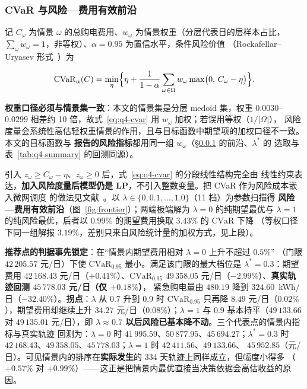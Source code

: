 \subsubsection{CVaR 与风险—费用有效前沿}\label{sec:q4-frontier}

记 \(C_\omega\) 为情景 \(\omega\) 的总购电费用、\(w_\omega\) 为情景权重（分层代表日的层样本占比，
\(\sum_\omega w_\omega=1\)，非等权）、\(\alpha=0.95\) 为置信水平，条件风险价值
（Rockafellar--Uryasev 形式~\cite{refrockafellar}）为

\begin{equation}
  \mathrm{CVaR}_\alpha(C)=\min_{\eta}\Bigl\{\eta+\frac{1}{1-\alpha}
  \sum_{\omega\in\Omega}w_\omega\max\bigl(0,\,C_\omega-\eta\bigr)\Bigr\}.
  \label{eq:q4-cvar}
\end{equation}

\textbf{权重口径必须与情景集一致}：本文的情景集是分层 medoid 集，权重 \(0.0030\)--\(0.0299\)
相差约 10 倍，故式~\eqref{eq:q4-cvar} 用 \(w_\omega\) 加权；若误用等权（\(1/|\Omega|\)），
风险度量会系统性高估轻权重情景的作用，且与目标函数中期望项的加权口径不一致。本文的目标函数与
\textbf{报告的风险指标}都用同一组 \(w_\omega\)（\S\ref{sec:q4-frontier} 的前沿、\(\lambda^*\) 的
选取与表~\ref{tab:q4-summary} 的回测同源）。

引入 \(z_\omega\ge C_\omega-\eta\)、\(z_\omega\ge0\) 后，式~\eqref{eq:q4-cvar} 的分段线性结构完全由
线性约束表达，\textbf{加入风险度量后模型仍是 LP}，不引入整数变量。把 CVaR 作为风险成本嵌入微网调度
的做法见文献~\cite{refchenhan}。以 \(\lambda\in\{0,0.1,\dots,1.0\}\)（11 档）为参数扫描得
\textbf{风险—费用有效前沿}（图~\ref{fig:frontier}）；两端极端解为 \(\lambda=0\) 的纯期望最优与
\(\lambda=1\) 的纯风险最优，后者以 \(0.99\%\) 的期望费用换取 \(3.43\%\) 的 \(\mathrm{CVaR}\) 下降
（等权口径下同一组解报 \(3.19\%\)，差别只来自风险统计量的加权方式，见上段）。

\textbf{推荐点的判据事先锁定}：在“情景内期望费用相对 \(\lambda=0\) 上升不超过 \(0.5\%\)”
（门限 \(42\,205.57\) 元/日）下使 \(\mathrm{CVaR}_{0.95}\) 最小。满足该门限的最大档位是
\(\lambda^{*}=0.3\)：期望费用 \(42\,168.43\) 元/日（\(+0.41\%\)）、\(\mathrm{CVaR}_{0.95}\)
\(49\,358.05\) 元/日（\(-2.99\%\)）、\textbf{真实轨迹回测 \(45\,778.03\) 元/日（仅 \(+0.18\%\)）}，
紧急购电量由 \(480.19\) 降到 \(324.60\)~kWh/日（\(-32.40\%\)）。\textbf{拐点}：\(\lambda\) 从 0.7 升到
0.9 时 \(\mathrm{CVaR}_{0.95}\) 只再降 \(8.49\) 元/日（\(0.02\%\)），期望费用却继续上升
\(34.27\) 元/日（\(0.08\%\)）；\(\lambda=1\) 与 0.9 基本持平（\(49\,133.66\) 对 \(49\,135.01\)
元/日），即 \textbf{\(\lambda\approx0.7\) 以后风险已基本降不动}。三个代表点的情景内指标与真实轨迹
回测为：\(\lambda=0\) 时 \(41\,995.59\)、\(50\,877.95\)、\(45\,694.27\)；\(\lambda^{*}=0.3\) 时
\(42\,168.43\)、\(49\,358.05\)、\(45\,778.03\)；\(\lambda=1\) 时 \(42\,411.56\)、\(49\,133.66\)、
\(45\,952.85\)（元/日）。可见情景内的排序在\textbf{实际发生}的 334 天轨迹上同样成立，但幅度小得多
（\(+0.57\%\) 对 \(+0.99\%\)）——这正是把情景内最优直接当决策依据会高估收益的原因。

